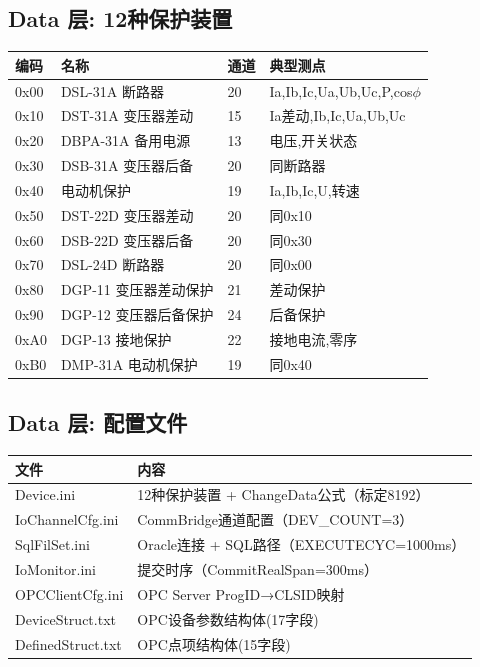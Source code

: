 \documentclass[12pt,a4paper]{ctexart}
\begin{document}
\subsection{Data 层: 12种保护装置}
\begin{longtable}{llll}
\toprule
\textbf{编码} & \textbf{名称} & \textbf{通道} & \textbf{典型测点} \\
\midrule
0x00 & DSL-31A 断路器 & 20 & Ia,Ib,Ic,Ua,Ub,Uc,P,cos$\phi$ \\
0x10 & DST-31A 变压器差动 & 15 & Ia差动,Ib,Ic,Ua,Ub,Uc \\
0x20 & DBPA-31A 备用电源 & 13 & 电压,开关状态 \\
0x30 & DSB-31A 变压器后备 & 20 & 同断路器 \\
0x40 & 电动机保护 & 19 & Ia,Ib,Ic,U,转速 \\
0x50 & DST-22D 变压器差动 & 20 & 同0x10 \\
0x60 & DSB-22D 变压器后备 & 20 & 同0x30 \\
0x70 & DSL-24D 断路器 & 20 & 同0x00 \\
0x80 & DGP-11 变压器差动保护 & 21 & 差动保护 \\
0x90 & DGP-12 变压器后备保护 & 24 & 后备保护 \\
0xA0 & DGP-13 接地保护 & 22 & 接地电流,零序 \\
0xB0 & DMP-31A 电动机保护 & 19 & 同0x40 \\
\bottomrule
\end{longtable}

\subsection{Data 层: 配置文件}
\begin{table}[H]\centering
\begin{tabular}{ll}
\toprule
\textbf{文件} & \textbf{内容} \\
\midrule
Device.ini & 12种保护装置 + ChangeData公式（标定8192） \\
IoChannelCfg.ini & CommBridge通道配置（DEV\_COUNT=3） \\
SqlFilSet.ini & Oracle连接 + SQL路径（EXECUTECYC=1000ms） \\
IoMonitor.ini & 提交时序（CommitRealSpan=300ms） \\
OPCClientCfg.ini & OPC Server ProgID→CLSID映射 \\
DeviceStruct.txt & OPC设备参数结构体(17字段) \\
DefinedStruct.txt & OPC点项结构体(15字段) \\
\bottomrule
\end{tabular}
\end{table}
\end{document}
